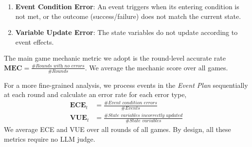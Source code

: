 \begin{enumerate}
\begin{enumerate}
        \item \textbf{Event Condition Error}: An event triggers when its entering condition is not met, or the outcome (success/failure) does not match the current state.
        \item \textbf{Variable Update Error}: The state variables do not update according to event effects.
    \end{enumerate}
    The main game mechanic metric we adopt is the round-level accurate rate $\textbf{MEC} = \frac{\# \textit{Rounds with no errors}}{\# \textit{Rounds}}.$
    We average the mechanic score over all games.
    
    For a more fine-grained analysis, we process events in the \textit{Event Plan} sequentially at each round and calculate an error rate for each error type,
    \begin{equation}
    \begin{aligned}
        \textbf{ECE}_t &= \frac{\# \textit{Event condition errors}}{\# \textit{Events}}\\
        \textbf{VUE}_t &= \frac{\# \textit{State variables incorrectly updated}}{\# \textit{State variables}}
    \end{aligned}
    \end{equation}    
    We average ECE and VUE over all rounds of all games. By design, all these metrics require no LLM judge. 
\end{enumerate}

